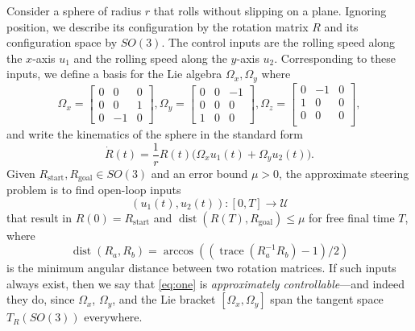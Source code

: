 \documentclass[letter paper, 10pt, conference]{ieeeconf}
\newcommand{\Uspace}{\mathcal{U}}
\newcommand{\Cspace}{\mathcal{R}}
\newcommand{\Rstart}{R_\text{start}}
\newcommand{\Rgoal}{R_\text{goal}}
\begin{document}
Consider a sphere of radius $r$ that rolls without slipping on a plane. 
Ignoring position, we describe its configuration by the rotation matrix $R$ and its configuration space by $SO(3)$. The control inputs are the rolling speed along the $x$-axis
$u_{1}$
and the rolling speed along the $y$-axis
$u_{2}$.
Corresponding to these inputs, we define 
a basis for the Lie algebra $\Omega_x,\Omega_y$ where
\[
\Omega_x \!=\! \begin{bmatrix}
0 &0 & 0 \\
0 &0 & 1\\
0&-1 & 0 \end{bmatrix}\!\!, 
\Omega_y \!=\!\begin{bmatrix}
0 &0 & -1 \\
0 &0 & 0\\
1&0 & 0 
\end{bmatrix}\!\!,
\Omega_z \!=\! \begin{bmatrix}
0 &-1 & 0 \\
1 &0 & 0 \\
0 &0 & 0 \\
\end{bmatrix}\!\!,
\]
and write the kinematics of the sphere in the standard form
\begin{equation}
\label{eq:one}
\dot{R}(t) = \frac{1}{r} R(t)   \bigg(  \Omega_x  u_1(t) + \Omega_y u_2(t) \bigg).
\end{equation}
Given $\Rstart,\Rgoal\in SO(3)$ and an error bound $\mu>0$, the approximate steering
problem
is to find open-loop inputs
\[
\left(u_{1}(t),u_{2}(t)\right) \colon [0,T] \to \Uspace
\]
that result in $R(0)=\Rstart$ and $\operatorname{dist}\!\left(R(T),\Rgoal\right)\leq\mu$ for free final time $T$, where \[\operatorname{dist}\!\left(R_a,R_b\right) = \arccos\left((\operatorname{trace}\left(R_a^{-1}R_b\right)-1)/2\right)\] is the minimum angular distance between two rotation matrices.
If such inputs always exist, then we say that \eqref{eq:one} is {\em approximately controllable}---and indeed they do, since $\Omega_x $, $\Omega_y$, and the Lie bracket $[\Omega_x,\Omega_y]$ span the tangent space $T_{R}\left(SO(3)\right)$ everywhere.
\end{document}

